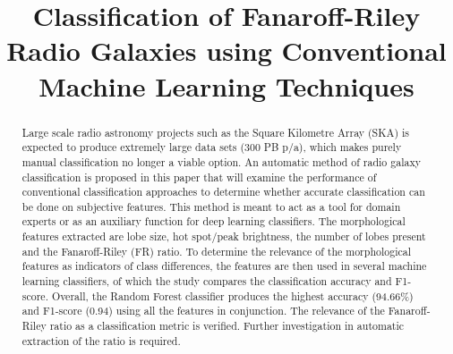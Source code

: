 \documentclass[conference]{IEEEtran}
\begin{document}
\title{Classification of Fanaroff-Riley Radio Galaxies using Conventional Machine Learning Techniques}

\author{
\and
{}
}

\maketitle

\begin{abstract}
Large scale radio astronomy projects such as the Square Kilometre Array (SKA) is expected to produce extremely large data sets (300 PB p/a), which makes purely manual classification no longer a viable option. An automatic method of radio galaxy classification is proposed in this paper that will examine the performance of conventional classification approaches to determine whether accurate classification can be done on subjective features.
This method is meant to act as a tool for domain experts or as an auxiliary function for deep learning classifiers. The morphological features extracted are lobe size, hot spot/peak brightness, the number of lobes present and the Fanaroff-Riley (FR) ratio. To determine the relevance of the morphological features as indicators of class differences, the features are then used in several machine learning classifiers, of which the study compares the classification accuracy and F1-score. Overall, the Random Forest classifier produces the highest accuracy (94.66\%) and F1-score (0.94) using all the features in conjunction. The relevance of the Fanaroff-Riley ratio as a classification metric is verified. Further investigation in automatic extraction of the ratio is required.

\end{abstract}
\end{document}
